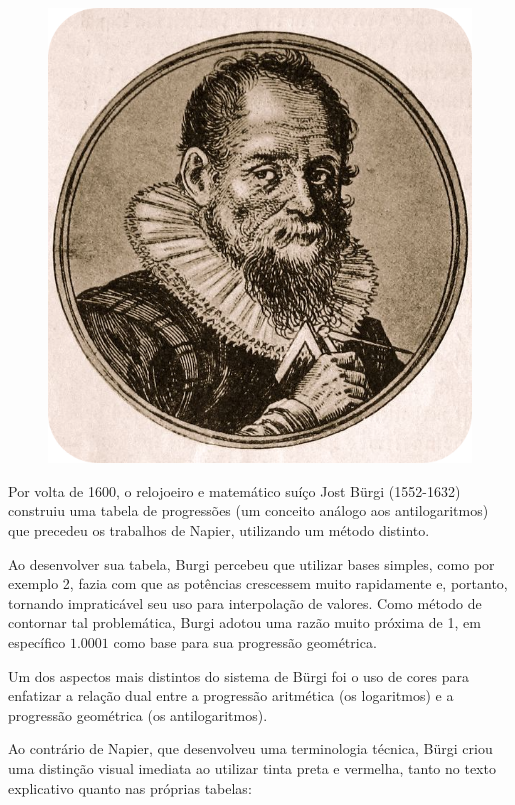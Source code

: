 \begin{figure}
    \setlength{\intextsep}{0pt}
    \vspace{-1.5em} 
    \centering
    \includegraphics[width=\linewidth]{img/burgi.png} 
\end{figure} 

Por volta de 1600, o relojoeiro e matemático suíço Jost Bürgi (1552-1632) construiu uma tabela de progressões (um conceito análogo aos antilogaritmos) que precedeu os trabalhos de Napier, utilizando um método distinto. 

Ao desenvolver sua tabela, Burgi percebeu que utilizar bases simples, como por exemplo 2, fazia com que as potências crescessem muito rapidamente e, portanto, tornando impraticável seu uso para interpolação de valores. Como método de contornar tal problemática, Burgi adotou uma razão muito próxima de 1, em específico $1.0001$ como base para sua progressão geométrica.

Um dos aspectos mais distintos do sistema de Bürgi foi o uso de cores para enfatizar a relação dual entre a progressão aritmética (os logaritmos) e a progressão geométrica (os antilogaritmos).

Ao contrário de Napier, que desenvolveu uma terminologia técnica, Bürgi criou uma distinção visual imediata ao utilizar tinta preta e vermelha, tanto no texto explicativo quanto nas próprias tabelas:

